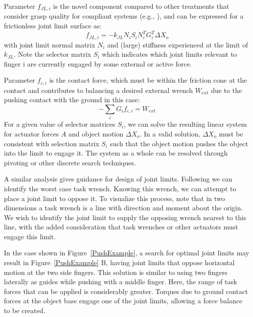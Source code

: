\smallskip
\noindent
Parameter $f_{JL, i}$ is the novel component compared to other treatments that consider grasp quality for compliant systems (e.g., \cite{lin2000stiffness}), and can be expressed for a frictionless joint limit surface as:
\begin{equation}
	f_{JL, i} = -k_{JL} N_i S_i N^T_i      G^T_i \Delta X_o
\end{equation}
with joint limit normal matrix $N_i$ and (large) stiffness experienced at the limit of $k_{JL}$.    Note the selector matrix $S_i$ which indicates which joint limits relevant to finger i are currently engaged by some external or active force.

\smallskip
\noindent
Parameter $f_{c, i}$ is the contact force, which must be within the friction cone at the contact and contributes to balancing a desired external wrench $W_{ext}$ due to the pushing contact with the ground in this case:
\begin{equation}
  - \sum_i G_i f_{c, i} = W_{ext}
\end{equation}
For a given value of selector matrices $S_i$, we can solve the resulting linear system for actuator forces $A$ and object motion $\Delta X_o$.    In a valid solution, $\Delta X_o$ must be consistent with selection matrix $S_i$ such that the object motion pushes the object into the limit to engage it.   The system as a whole can be resolved through pivoting or other discrete search techniques.

A similar analysis gives guidance for design of joint limits.  Following \cite{Li:graspDB07} we can identify the worst case task wrench.   Knowing this wrench, we can attempt to place a joint limit to oppose it.   To visualize this process, note that in two dimensions a task wrench is a line with direction and moment about the origin.  We wish to identify the joint limit to supply the opposing wrench nearest to this line, with the added consideration that task wrenches or other actuators must engage this limit.
 
In the case shown in Figure~\ref{PushExample}, a search for optimal joint limits may result in Figure~\ref{PushExample} B, having joint limits that oppose horizontal motion at the two side fingers.   This solution is similar to using two fingers laterally as guides while pushing with a middle finger.   Here, the range of task forces that can be applied is considerably greater.     Torques due to ground contact forces at the object base engage one of the joint limits, allowing a force balance to be created.

